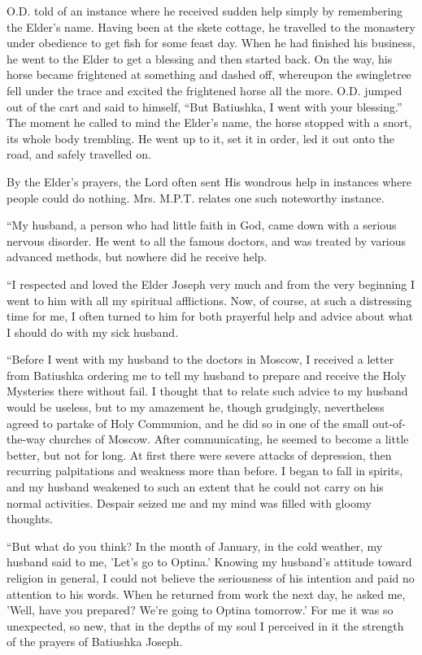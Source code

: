 O.D. told of an instance where he received sudden help simply by remembering the Elder's name. Having been at the skete cottage, he travelled to the monastery under obedience to get fish for some feast day. When he had finished his business, he went to the Elder to get a blessing and then started back. On the way, his horse became frightened at something and dashed off, whereupon the swingletree fell under the trace and excited the frightened horse all the more. O.D. jumped out of the cart and said to himself, “But Batiushka, I went with your blessing.” The moment he called to mind the Elder's name, the horse stopped with a snort, its whole body trembling. He went up to it, set it in order, led it out onto the road, and safely travelled on.

By the Elder's prayers, the Lord often sent His wondrous help in instances where people could do nothing. Mrs. M.P.T. relates one such noteworthy instance.

“My husband, a person who had little faith in God, came down with a serious nervous disorder. He went to all the famous doctors, and was treated by various advanced methods, but nowhere did he receive help.

“I respected and loved the Elder Joseph very much and from the very beginning I went to him with all my spiritual afflictions. Now, of course, at such a distressing time for me, I often turned to him for both prayerful help and advice about what I should do with my sick husband.

“Before I went with my husband to the doctors in Moscow, I received a letter from Batiushka ordering me to tell my husband to prepare and receive the Holy Mysteries there without fail. I thought that to relate such advice to my husband would be useless, but to my amazement he, though grudgingly, nevertheless agreed to partake of Holy Communion, and he did so in one of the small out-of-the-way churches of Moscow. After communicating, he seemed to become a little better, but not for long. At first there were severe attacks of depression, then recurring palpitations and weakness more than before. I began to fall in spirits, and my husband weakened to such an extent that he could not carry on his normal activities. Despair seized me and my mind was filled with gloomy thoughts.

“But what do you think? In the month of January, in the cold weather, my husband said to me, 'Let's go to Optina.' Knowing my husband's attitude toward religion in general, I could not believe the seriousness of his intention and paid no attention to his words. When he returned from work the next day, he asked me, 'Well, have you prepared? We're going to Optina tomorrow.' For me it was so unexpected, so new, that in the depths of my soul I perceived in it the strength of the prayers of Batiushka Joseph.

